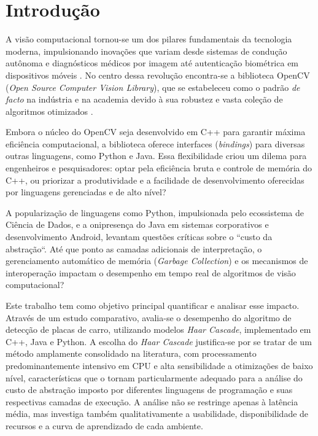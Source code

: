 \section{Introdução}

A visão computacional tornou-se um dos pilares fundamentais da tecnologia moderna, impulsionando inovações que variam desde sistemas de condução autônoma e diagnósticos médicos por imagem até autenticação biométrica em dispositivos móveis \citep{Szeliski2022}. No centro dessa revolução encontra-se a biblioteca OpenCV (\textit{Open Source Computer Vision Library}), que se estabeleceu como o padrão \textit{de facto} na indústria e na academia devido à sua robustez e vasta coleção de algoritmos otimizados \citep{bradski2000opencv}.

Embora o núcleo do OpenCV seja desenvolvido em C++ para garantir máxima eficiência computacional, a biblioteca oferece interfaces (\textit{bindings}) para diversas outras linguagens, como Python e Java. Essa flexibilidade criou um dilema para engenheiros e pesquisadores: optar pela eficiência bruta e controle de memória do C++, ou priorizar a produtividade e a facilidade de desenvolvimento oferecidas por linguagens gerenciadas e de alto nível?

A popularização de linguagens como Python, impulsionada pelo ecossistema de Ciência de Dados, e a onipresença do Java em sistemas corporativos e desenvolvimento Android, levantam questões críticas sobre o ``custo da abstração``. Até que ponto as camadas adicionais de interpretação, o gerenciamento automático de memória (\textit{Garbage Collection}) e os mecanismos de interoperação impactam o desempenho em tempo real de algoritmos de visão computacional?

Este trabalho tem como objetivo principal quantificar e analisar esse impacto. Através de um estudo comparativo, avalia-se o desempenho do algoritmo de detecção de placas de carro, utilizando modelos \textit{Haar Cascade}, implementado em C++, Java e Python. A escolha do \textit{Haar Cascade} justifica-se por se tratar de um método amplamente consolidado na literatura, com processamento predominantemente intensivo em CPU e alta sensibilidade a otimizações de baixo nível, características que o tornam particularmente adequado para a análise do custo de abstração imposto por diferentes linguagens de programação e suas respectivas camadas de execução. A análise não se restringe apenas à latência média, mas investiga também qualitativamente a usabilidade, disponibilidade de recursos e a curva de aprendizado de cada ambiente.

